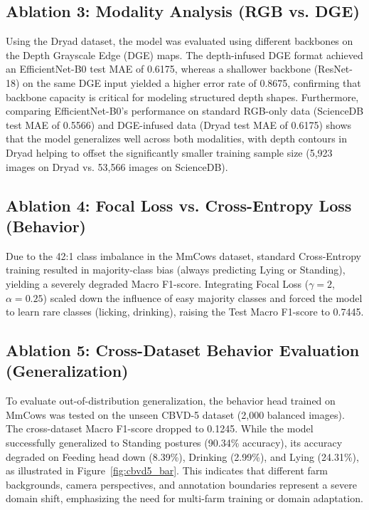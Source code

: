 \subsection{Ablation 3: Modality Analysis (RGB vs. DGE)}
Using the Dryad dataset, the model was evaluated using different backbones on the Depth Grayscale Edge (DGE) maps. The depth-infused DGE format achieved an EfficientNet-B0 test MAE of 0.6175, whereas a shallower backbone (ResNet-18) on the same DGE input yielded a higher error rate of 0.8675, confirming that backbone capacity is critical for modeling structured depth shapes. Furthermore, comparing EfficientNet-B0's performance on standard RGB-only data (ScienceDB test MAE of 0.5566) and DGE-infused data (Dryad test MAE of 0.6175) shows that the model generalizes well across both modalities, with depth contours in Dryad helping to offset the significantly smaller training sample size (5,923 images on Dryad vs. 53,566 images on ScienceDB).

\subsection{Ablation 4: Focal Loss vs. Cross-Entropy Loss (Behavior)}
Due to the 42:1 class imbalance in the MmCows dataset, standard Cross-Entropy training resulted in majority-class bias (always predicting Lying or Standing), yielding a severely degraded Macro F1-score. Integrating Focal Loss ($\gamma = 2$, $\alpha = 0.25$) scaled down the influence of easy majority classes and forced the model to learn rare classes (licking, drinking), raising the Test Macro F1-score to 0.7445.

\subsection{Ablation 5: Cross-Dataset Behavior Evaluation (Generalization)}
To evaluate out-of-distribution generalization, the behavior head trained on MmCows was tested on the unseen CBVD-5 dataset (2,000 balanced images). The cross-dataset Macro F1-score dropped to 0.1245. While the model successfully generalized to Standing postures (90.34\% accuracy), its accuracy degraded on Feeding head down (8.39\%), Drinking (2.99\%), and Lying (24.31\%), as illustrated in Figure~\ref{fig:cbvd5_bar}. This indicates that different farm backgrounds, camera perspectives, and annotation boundaries represent a severe domain shift, emphasizing the need for multi-farm training or domain adaptation.

